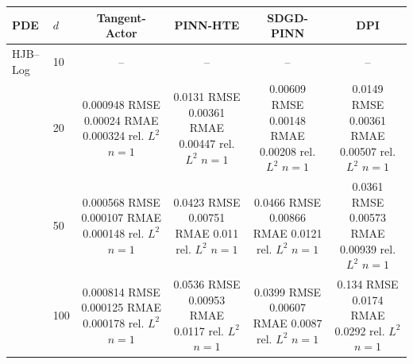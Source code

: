 \begin{tabular}{llcccc}
\toprule
PDE & $d$ & Tangent-Actor & PINN-HTE & SDGD-PINN & DPI \\
\midrule
HJB–Log & 10 & -- & -- & -- & -- \\
 & 20 & \shortstack{0.000948 RMSE\\0.00024 RMAE\\0.000324 rel. $L^2$\\$n=1$} & \shortstack{0.0131 RMSE\\0.00361 RMAE\\0.00447 rel. $L^2$\\$n=1$} & \shortstack{0.00609 RMSE\\0.00148 RMAE\\0.00208 rel. $L^2$\\$n=1$} & \shortstack{0.0149 RMSE\\0.00361 RMAE\\0.00507 rel. $L^2$\\$n=1$} \\
 & 50 & \shortstack{0.000568 RMSE\\0.000107 RMAE\\0.000148 rel. $L^2$\\$n=1$} & \shortstack{0.0423 RMSE\\0.00751 RMAE\\0.011 rel. $L^2$\\$n=1$} & \shortstack{0.0466 RMSE\\0.00866 RMAE\\0.0121 rel. $L^2$\\$n=1$} & \shortstack{0.0361 RMSE\\0.00573 RMAE\\0.00939 rel. $L^2$\\$n=1$} \\
 & 100 & \shortstack{0.000814 RMSE\\0.000125 RMAE\\0.000178 rel. $L^2$\\$n=1$} & \shortstack{0.0536 RMSE\\0.00953 RMAE\\0.0117 rel. $L^2$\\$n=1$} & \shortstack{0.0399 RMSE\\0.00607 RMAE\\0.0087 rel. $L^2$\\$n=1$} & \shortstack{0.134 RMSE\\0.0174 RMAE\\0.0292 rel. $L^2$\\$n=1$} \\

\end{tabular}
